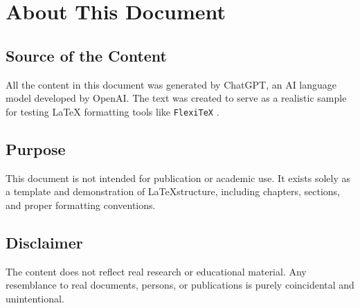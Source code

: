 \chapter{About This Document}
\section{Source of the Content}
All the content in this document was generated by ChatGPT, an AI language model developed by OpenAI. The text was created to serve as a realistic sample for testing LaTeX formatting tools like
\texttt{Flexi\TeX}
.
\section{Purpose}
This document is not intended for publication or academic use. It exists solely as a template and demonstration of
\LaTeX structure, including chapters, sections, and proper formatting conventions.
\section{Disclaimer}
The content does not reflect real research or educational material. Any resemblance to real documents, persons, or publications is purely coincidental and unintentional.
